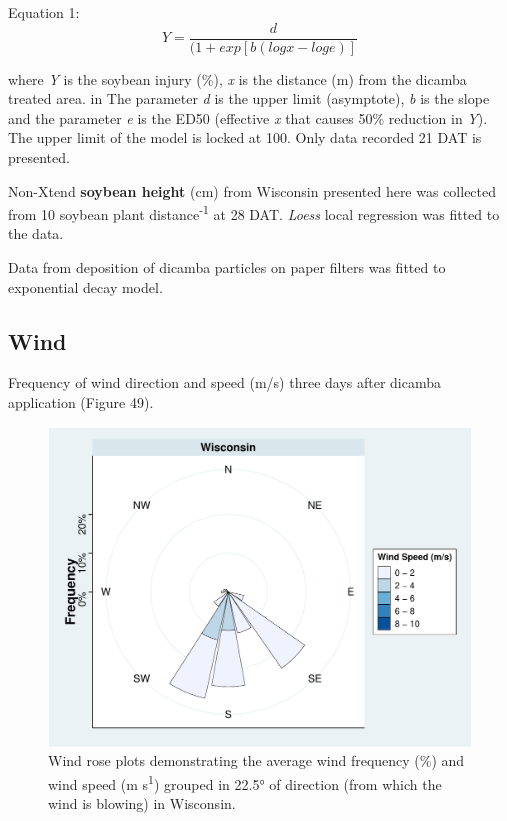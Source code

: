 \documentclass[]{article}
\begin{document}
Equation 1: \[Y= \frac{d}{(1 + exp[b(logx - loge)]} \]

where \emph{Y} is the soybean injury (\%), \emph{x} is the distance (m)
from the dicamba treated area. in The parameter \emph{d} is the upper
limit (asymptote), \emph{b} is the slope and the parameter \emph{e} is
the ED50 (effective \emph{x} that causes 50\% reduction in \emph{Y}).
The upper limit of the model is locked at 100. Only data recorded 21 DAT
is presented.

Non-Xtend \textbf{soybean height} (cm) from Wisconsin presented here was
collected from 10 soybean plant distance\textsuperscript{-1} at 28 DAT.
\emph{Loess} local regression was fitted to the data.

Data from deposition of dicamba particles on paper filters was fitted to
exponential decay model.

\pagebreak
\newpage

\subsection{Wind}\label{wind-5}

Frequency of wind direction and speed (m/s) three days after dicamba
application (Figure 49).

\begin{figure}
\centering
\includegraphics{Report_files/figure-latex/unnamed-chunk-97-1.pdf}
\caption{Wind rose plots demonstrating the average wind frequency (\%)
and wind speed (m s\textsuperscript{1}) grouped in 22.5° of direction
(from which the wind is blowing) in Wisconsin.}
\end{figure}
\end{document}
